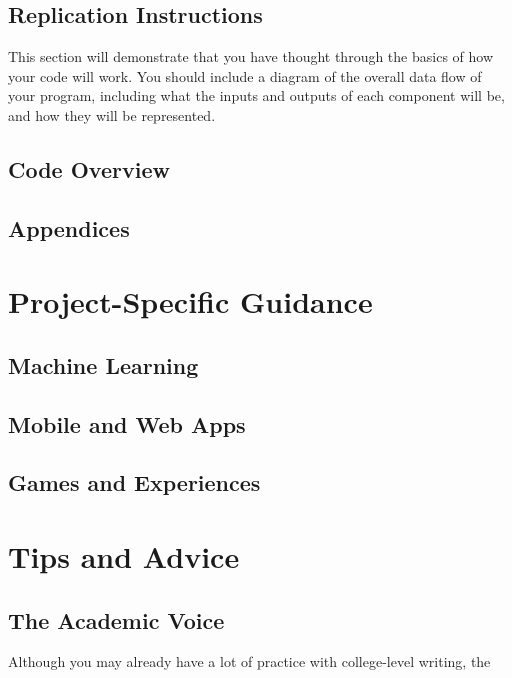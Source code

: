 \documentclass[10pt,twocolumn]{article}
\begin{document}
\subsection{Replication Instructions}

This section will demonstrate that you have thought through the basics of how your code will work. You should include a diagram of the overall data flow of your program, including what the inputs and outputs of each component will be, and how they will be represented.

\subsection{Code Overview}

\subsection{Appendices}

\section{Project-Specific Guidance}

\subsection{Machine Learning}

\subsection{Mobile and Web Apps}

\subsection{Games and Experiences}

\section{Tips and Advice}

\subsection{The Academic Voice}

Although you may already have a lot of practice with college-level writing, the \cite{InkAndSwitch2022AcademishVoice}

\printbibliography
\end{document}
